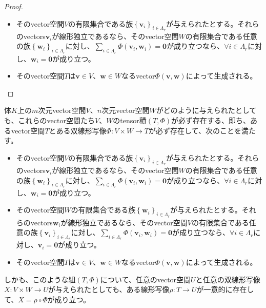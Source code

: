 \documentclass[dvipdfmx]{jsarticle}
\begin{document}
\begin{proof}
\begin{itemize}
\item
  そのvector空間$V$の有限集合である族$\left\{ \mathbf{v}_{i} \right\}_{i \in \varLambda_{r}}$が与えられたとする。それらのvectors$\mathbf{v}_{i}$が線形独立であるなら、そのvector空間$W$の有限集合である任意の族$\left\{ \mathbf{w}_{i} \right\}_{i \in \varLambda_{r}}$に対し、$\sum_{i \in \varLambda_{r}} {\varPhi\left( \mathbf{v}_{i},\mathbf{w}_{i} \right)} = \mathbf{0}$が成り立つなら、$\forall i \in \varLambda_{r}$に対し、$\mathbf{w}_{i} = \mathbf{0}$が成り立つ。
\item
  そのvector空間$T$は$\mathbf{v} \in V$、$\mathbf{w} \in W$なるvector$\varPhi\left( \mathbf{v},\mathbf{w} \right)$によって生成される。
\end{itemize}
\end{proof}
\begin{thm}\label{2.4.5.3}
体$K$上の$m$次元vector空間$V$、$n$次元vector空間$W$がどのように与えられたとしても、これらのvector空間たち$V$、$W$のtensor積$(T,\varPhi)$が必ず存在する、即ち、あるvector空間$T$とある双線形写像$\varPhi:V \times W \rightarrow T$が必ず存在して、次のことを満たす。
\begin{itemize}
\item
  そのvector空間$V$の有限集合である族$\left\{ \mathbf{v}_{i} \right\}_{i \in \varLambda_{r}}$が与えられたとする。それらのvectors$\mathbf{v}_{i}$が線形独立であるなら、そのvector空間$W$の有限集合である任意の族$\left\{ \mathbf{w}_{i} \right\}_{i \in \varLambda_{r}}$に対し、$\sum_{i \in \varLambda_{r}} {\varPhi\left( \mathbf{v}_{i},\mathbf{w}_{i} \right)} = \mathbf{0}$が成り立つなら、$\forall i \in \varLambda_{r}$に対し、$\mathbf{w}_{i} = \mathbf{0}$が成り立つ。
\item
  そのvector空間$W$の有限集合である族$\left\{ \mathbf{w}_{i} \right\}_{i \in \varLambda_{r}}$が与えられたとする。それらのvectors$\mathbf{w}_{i}$が線形独立であるなら、そのvector空間$V$の有限集合である任意の族$\left\{ \mathbf{v}_{i} \right\}_{i \in \varLambda_{r}}$に対し、$\sum_{i \in \varLambda_{r}} {\varPhi\left( \mathbf{v}_{i},\mathbf{w}_{i} \right)} = \mathbf{0}$が成り立つなら、$\forall i \in \varLambda_{r}$に対し、$\mathbf{v}_{i} = \mathbf{0}$が成り立つ。
\item
  そのvector空間$T$は$\mathbf{v} \in V$、$\mathbf{w} \in W$なるvector$\varPhi\left( \mathbf{v},\mathbf{w} \right)$によって生成される。
\end{itemize}
しかも、このような組$(T,\varPhi)$について、任意のvector空間$U$と任意の双線形写像$X:V \times W \rightarrow U$が与えられたとしても、ある線形写像$\rho:T \rightarrow U$が一意的に存在して、$X = \rho \circ \varPhi$が成り立つ。
\end{thm}
\end{document}
